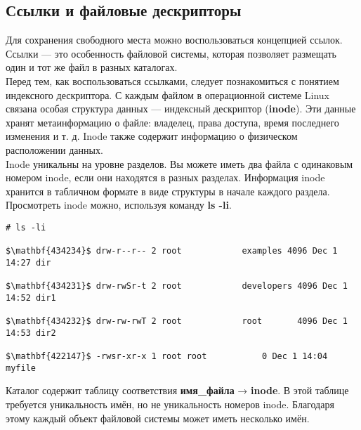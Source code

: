 \documentclass[14pt, a4paper]{article}
\begin{document}
\subsection*{Ссылки и файловые дескрипторы} 

Для сохранения свободного места можно воспользоваться концепцией ссылок. Ссылки — это
особенность файловой системы, которая позволяет размещать один и тот же файл в разных
каталогах.\\

Перед тем, как воспользоваться ссылками, следует познакомиться с понятием индексного
дескриптора. С каждым файлом в операционной системе Linux связана особая структура данных —
индексный дескриптор (\textbf{inode}). Эти данные хранят метаинформацию о файле: владелец, права
доступа, время последнего изменения и т. д. Inode также содержит информацию о физическом
расположении данных.\\

Inode уникальны на уровне разделов. Вы можете иметь два файла с одинаковым номером inode, если
они находятся в разных разделах. Информация inode хранится в табличном формате в виде
структуры в начале каждого раздела. Просмотреть inode можно, используя команду \textbf{ls -li}.

\vspace{0.3cm}

\begin{lstlisting}
# ls -li

$\mathbf{434234}$ drw-r--r-- 2 root            examples 4096 Dec 1 14:27 dir

$\mathbf{434231}$ drw-rwSr-t 2 root            developers 4096 Dec 1 14:52 dir1

$\mathbf{434232}$ drw-rw-rwT 2 root            root       4096 Dec 1 14:53 dir2

$\mathbf{422147}$ -rwsr-xr-x 1 root root           0 Dec 1 14:04 myfile

\end{lstlisting}

\vspace{0.2cm}

Каталог содержит таблицу соответствия \textbf{имя\_файла} → \textbf{inode}. В этой таблице требуется уникальность
имён, но не уникальность номеров inode. Благодаря этому каждый объект файловой системы может
иметь несколько имён.\\
\end{document}
